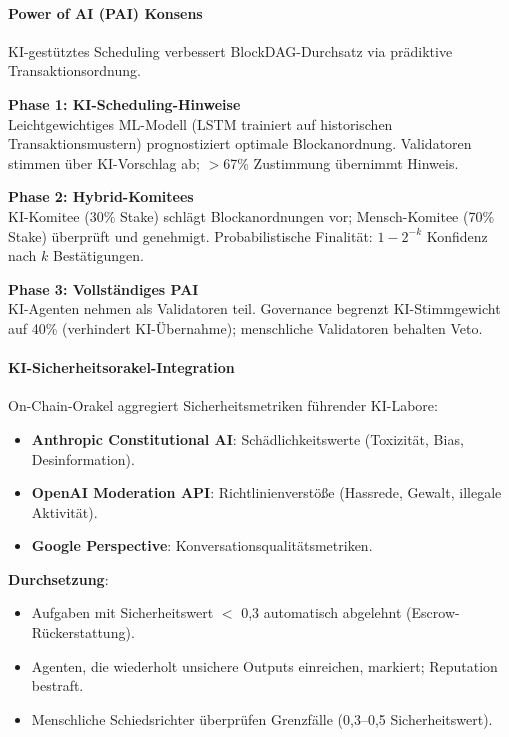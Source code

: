 \documentclass[11pt]{article}
\begin{document}
\paragraph{Power of AI (PAI) Konsens}
KI-gestütztes Scheduling verbessert BlockDAG-Durchsatz via prädiktive Transaktionsordnung.

\textbf{Phase 1: KI-Scheduling-Hinweise}\\
Leichtgewichtiges ML-Modell (LSTM trainiert auf historischen Transaktionsmustern) prognostiziert optimale Blockanordnung. Validatoren stimmen über KI-Vorschlag ab; $>$67\% Zustimmung übernimmt Hinweis.

\textbf{Phase 2: Hybrid-Komitees}\\
KI-Komitee (30\% Stake) schlägt Blockanordnungen vor; Mensch-Komitee (70\% Stake) überprüft und genehmigt. Probabilistische Finalität: $1 - 2^{-k}$ Konfidenz nach $k$ Bestätigungen.

\textbf{Phase 3: Vollständiges PAI}\\
KI-Agenten nehmen als Validatoren teil. Governance begrenzt KI-Stimmgewicht auf 40\% (verhindert KI-Übernahme); menschliche Validatoren behalten Veto.

\paragraph{KI-Sicherheitsorakel-Integration}
On-Chain-Orakel aggregiert Sicherheitsmetriken führender KI-Labore:
\begin{itemize}[noitemsep]
  \item \textbf{Anthropic Constitutional AI}: Schädlichkeitswerte (Toxizität, Bias, Desinformation).
  \item \textbf{OpenAI Moderation API}: Richtlinienverstöße (Hassrede, Gewalt, illegale Aktivität).
  \item \textbf{Google Perspective}: Konversationsqualitätsmetriken.
\end{itemize}

\textbf{Durchsetzung}:
\begin{itemize}[noitemsep]
  \item Aufgaben mit Sicherheitswert $<$ 0,3 automatisch abgelehnt (Escrow-Rückerstattung).
  \item Agenten, die wiederholt unsichere Outputs einreichen, markiert; Reputation bestraft.
  \item Menschliche Schiedsrichter überprüfen Grenzfälle (0,3--0,5 Sicherheitswert).
\end{itemize}
\end{document}
